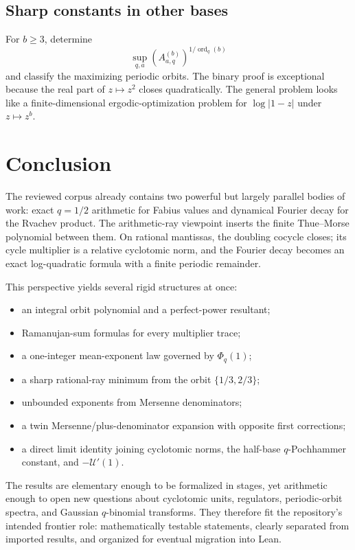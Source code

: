 \documentclass[11pt,oneside]{article}
\theoremstyle{definition}
\theoremstyle{remark}
\newcommand{\ord}{\operatorname{ord}}
\begin{document}
\subsection{Sharp constants in other bases}

For $b\ge3$, determine
\[
 \sup_{q,a}\left(A_{a,q}^{(b)}\right)^{1/\ord_q(b)}
\]
and classify the maximizing periodic orbits. The binary proof is exceptional
because the real part of $z\mapsto z^2$ closes quadratically. The general problem
looks like a finite-dimensional ergodic-optimization problem for
$\log|1-z|$ under $z\mapsto z^b$.

\section{Conclusion}\label{p2:sec:conclusion}

The reviewed corpus already contains two powerful but largely parallel bodies of
work: exact $q=1/2$ arithmetic for Fabius values and dynamical Fourier decay for the
Rvachev product. The arithmetic-ray viewpoint inserts the finite Thue--Morse
polynomial between them. On rational mantissas, the doubling cocycle closes; its
cycle multiplier is a relative cyclotomic norm, and the Fourier decay becomes an
exact log-quadratic formula with a finite periodic remainder.

This perspective yields several rigid structures at once:
\begin{itemize}
 \item an integral orbit polynomial and a perfect-power resultant;
 \item Ramanujan-sum formulas for every multiplier trace;
 \item a one-integer mean-exponent law governed by $\Phi_q(1)$;
 \item a sharp rational-ray minimum from the orbit $\{1/3,2/3\}$;
 \item unbounded exponents from Mersenne denominators;
 \item a twin Mersenne/plus-denominator expansion with opposite first corrections;
 \item a direct limit identity joining cyclotomic norms, the half-base
 $q$-Pochhammer constant, and $-\mathscr U'(1)$.
\end{itemize}
The results are elementary enough to be formalized in stages, yet arithmetic enough
to open new questions about cyclotomic units, regulators, periodic-orbit spectra,
and Gaussian $q$-binomial transforms. They therefore fit the repository's intended
frontier role: mathematically testable statements, clearly separated from imported
results, and organized for eventual migration into Lean.
\end{document}
